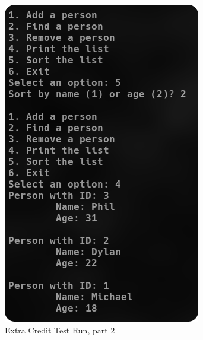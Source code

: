 \documentclass[
	letterpaper, %
	10pt, %
]{CSUniSchoolLabReport}
\begin{document}
\begin{figure}[H]
  \centering
  \includegraphics[width=.9\textwidth]{Figures/EC2.png}
  \caption{Extra Credit Test Run, part 2}
  \label{fig:2}
\end{figure}
\end{document}
